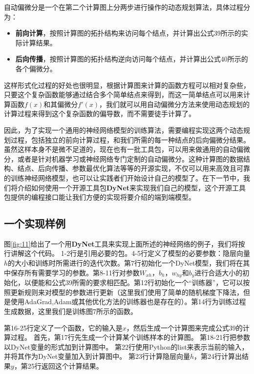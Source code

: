 \documentclass[10pt,a4paper]{ctexart}
\begin{document}
自动偏微分是一个在第二个计算图上分两步进行操作的动态规划算法，具体过程分为：
\begin{itemize}
\item \textbf{前向计算}，按照计算图的拓扑结构来访问每个结点，并计算出公式39所示的实际计算结果。
\item \textbf{后向传播}，按照计算图的拓扑结构逆向访问每个结点，并计算出公式40所示的各个偏微分。
\end{itemize}
这样形式化过程的好处也很明显，根据计算图来计算的函数方程可以相对复杂些，只要这个复杂函数能够通过结合多个简单结点来得到，而这一简单结点可以用来计算函数$f(x)$和其偏微分$f'(x)$，我们就可以用自动偏微分方法来使用动态规划的计算过程来得到这个复杂函数的偏导数，而不需要徒手计算了。

因此，为了实现一个通用的神经网络模型的训练算法，需要编程实现这两个动态规划过程，包括独立的前向计算过程，和我们所需的每一种结点的后向偏微分结果。虽然这样本身不是微不足道的，现在也有一批工具包，可以用来做通用的自动偏微分\cite{bendtsen1996fadbad,hogan2014fast}，或者是针对机器学习或神经网络专门定制的自动偏微分\cite{abadi2016tensorflow,bergstra2010theano,collobert2002torch,tokui2015chainer,neubig2017dynet}。这种计算图的数据结构、结点、后向传播、参数最优化算法等等的开源实现，不仅可以用来高效且可靠的训练神经网络模型，也可以让实践者们开始设计自己的模型了。在下一节中，我们将介绍如何使用一个开源工具包\textbf{DyNet}来实现我们自己的模型，这个开源工具包提供的编程接口能让我们方便的实现将要介绍的端到端模型。

\subsection{一个实现样例}
图\ref{fig:11}给出了一个用\textbf{DyNet}工具来实现上面所述的神经网络的例子，我们将按行讲解这个代码。
1-2行是引用必要的包。4-5行定义了模型的必要参数：隐层向量\textbf{$h$}的大小和训练时所需进行的迭代次数。第7行初始化一个DyNet模型，我们将在其中保存所有需要学习的参数。第8-11行对参数$W_{xh}$，$b_h$，$w_{hy}$和$b_y$进行合适大小的初始化，以便能和公式39所需的要求相匹配。第12行初始化一个“训练器”，它可以按照更新规则来对模型的参数进行更新（这里我们使用了简单的随机梯度下降法，但是使用AdaGrad,Adam或其他优化方法的训练器也是存在的）。第14行为训练过程生成数据，这里我们是训练图7所示的函数。

第16-25行定义了一个函数，它的输入是\textbf{$x$}，然后生成一个计算图来完成公式39的计算过程。
首先，第17行先生成一个计算某个训练样本的计算图。
第18-21行把参数以DyNet变量的形式加到计算图中。
第22行使用Python的list来表示当前的输入，并将其作为DyNet变量加入到计算图中。
第23行计算隐层向量\textbf{$h$}，第24行计算出结果$y$，第25行返回这个计算结果。
\end{document}

